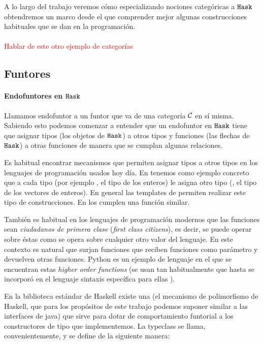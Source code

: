 A lo largo del trabajo veremos cómo especializando nociones
categóricas a $\texttt{Hask}$ obtendremos un marco desde el que comprender
mejor algunas construcciones habituales que se dan en la programación.

\paragraph{}
\textcolor{red}{Hablar de este otro ejemplo de categorías}


\subsection{Funtores}
\paragraph{Endofuntores en $\texttt{Hask}$}
Llamamos endofuntor a un funtor que va de una categoría $\mathcal{C}$ en sí misma.
Sabiendo esto podemos comenzar a entender que un endofuntor
en $\texttt{Hask}$ tiene que asignar tipos (los objetos de $\texttt{Hask}$) a
otros tipos y funciones (las flechas de $\texttt{Hask}$) a otras funciones
de manera que se cumplan algunas relaciones.

Es habitual encontrar mecanismos que permiten asignar tipos a otros tipos
en los lenguajes de programación usados hoy día. En 
tenemos como ejemplo concreto  que a cada tipo
(por ejemplo , el tipo de los enteros)
le asigna otro tipo (, el tipo
de los vectores de enteros). En
general las templates de  permiten realizar este tipo de
construcciones. En  los  cumplen una función similar.

También es habitual en los lenguajes de programación modernos
que las funciones
sean \textit{ciudadanos de primera clase} (\textit{first class citizens}),
es decir, se puede operar sobre éstas como se opera sobre
cualquier otro valor del lenguaje. En este contexto es natural que
surjan funciones que reciben funciones como parámetro y devuelven
otras funciones. Python es un ejemplo de lenguaje en el que
se encuentran estas \textit{higher order functions} (se usan
tan habitualmente que hasta se incorporó en el
lenguaje sintaxis específica para ellas \cite{decorators}).

En la biblioteca estándar de Haskell existe una 
(el mecanismo de polimorfismo de Haskell, que para los propósitos
de este trabajo podemos suponer similar a las interfaces de java)
que sirve para dotar de comportamiento funtorial a los constructores
de tipo que implementemos. La typeclass
se llama, convenientemente,  \cite{haskell-functor} y se
define de la siguiente manera:

